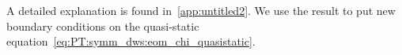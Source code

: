 

    

    A detailed explanation is found in~\cref{app:untitled2}. We use the result to put new boundary conditions on the quasi-static equation~\cref{eq:PT:symm_dws:eom_chi_quasistatic}. 



    
    








